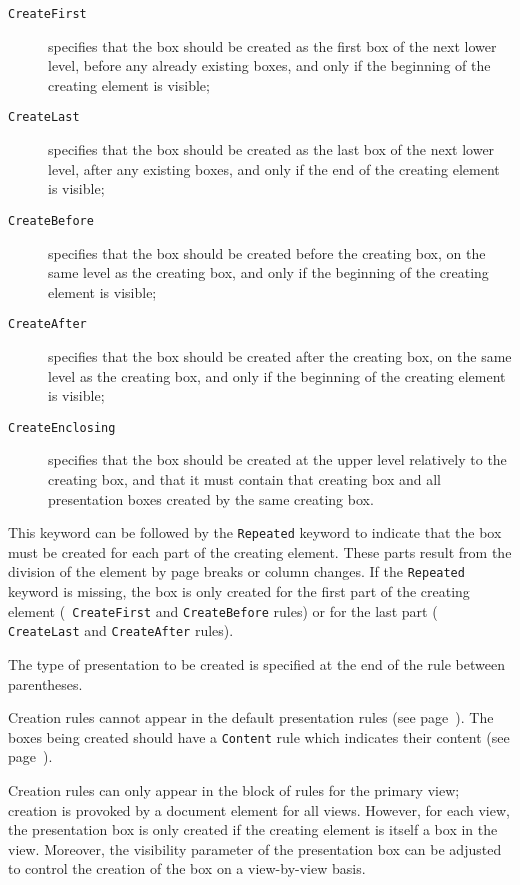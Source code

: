 \begin{description}
\item[ {\tt CreateFirst} ]specifies that the box should be created as
the first box of the next lower level, before any already existing
boxes, and only if the beginning of the creating element is visible;

\item[ {\tt CreateLast} ]specifies that the box should be created as
the last box of the next lower level, after any existing boxes, and
only if the end of the creating element is visible;

\item[ {\tt CreateBefore} ]specifies that the box should be created
before the creating box, on the same level as the creating box, and
only if the beginning of the creating element is visible;

\item[ {\tt CreateAfter} ]specifies that the box should be created
after the creating box, on the same level as the creating box, and
only if the beginning of the creating element is visible;

\item[ {\tt CreateEnclosing} ]specifies that the box should be created
at the upper level relatively to the creating box, and that it must
contain that creating box and all presentation boxes created by the
same creating box.

\end{description}

This keyword can be followed by the {\tt Repeated} keyword to indicate
that the box must be created for each part of the creating element.
These parts result from the division of the element by page breaks or
column changes.  If the {\tt Repeated} keyword is missing, the box is
only created for the first part of the creating element ({\tt
CreateFirst} and {\tt CreateBefore} rules) or for the last part ({\tt
CreateLast} and {\tt CreateAfter} rules).

The type of presentation to be created is specified at the end of the
rule between parentheses.

Creation rules cannot appear in the default presentation rules (see
page~\pageref{reglesdefaut}).  The boxes being created should have a
{\tt Content} rule which indicates their content (see
page~\pageref{content}).

Creation rules can only appear in the block of rules for the primary
view; creation is provoked by a document element for all views.
However, for each view, the presentation box is only created if the
creating element is itself a box in the view. Moreover, the visibility
parameter of the presentation box can be adjusted to control the
creation of the box on a view-by-view basis.


